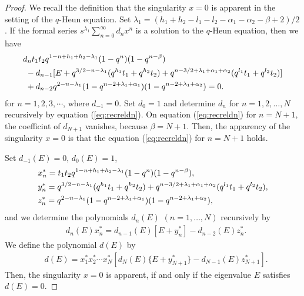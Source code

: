 \documentclass[10pt,a4paper]{amsart}
\begin{document}
\begin{proof}
We recall the definition that the singularity $x=0$ is apparent in the setting of the $q$-Heun equation.
Set $\lambda_{1} = (h_{1} + h_{2} - l_{1} - l_{2} - \alpha_{1} - \alpha_{2} - \beta + 2)/2$.
If the formal series $ s^{\lambda _{1}} \sum_{n =0}^{\infty } d_{n} x^{n} $ is a solution to the $q$-Heun equation, then we have
\begin{align}
 & d_{n} t_{1}t_{2}q^{  1- n + h_{1} + h_{2} - \lambda _{1}} (1 - q^{n})(1 - q^{n - \beta }) \label{eq:recreldn} \\
 & \ - d_{n - 1} [E + q^{3/2- n - \lambda _{1} } (q^{h_{1}}t_{1} + q^{h_{2}}t_{2} ) + q^{n - 3/2 + \lambda _{1} + \alpha _{1} + \alpha _{2} }( q^{l_{1}}t_{1} + q^{l_{2}}t_{2} ) ] \notag \\
 & \ + d_{n - 2} q^{ 2- n - \lambda _{1} } (1 - q^{n - 2 + \lambda _{1} + \alpha _{1} })(1 - q^{n - 2 + \lambda _{1} + \alpha _{2} }) = 0 . \notag
  \end{align}
for $n = 1 ,2,3, \cdots $, where $d_{-1} =0$.
Set $d_0=1$ and determine $d_n$ for $n=1,2,\dots ,N$ recursively by equation (\ref{eq:recreldn}).
On equation (\ref{eq:recreldn}) for $n=N+1$, the coefficint of $d_{N+1}$ vanishes, because $\beta = N +1 $.
Then, the apparency of the singularity $x=0$ is that the equation (\ref{eq:recreldn}) for $n=N+1$ holds.

Set $d_{-1}(E)=0 $,  $d_0(E)=1 $,
\begin{align*}
 & x^* _n = t_{1}t_{2}q^{  1- n + h_{1} + h_{2} - \lambda _{1}} (1 - q^{n})(1 - q^{n - \beta }) , \\
 & y^* _n = q^{3/2- n - \lambda _{1} } (q^{h_{1}}t_{1} + q^{h_{2}}t_{2} ) + q^{n - 3/2 + \lambda _{1} + \alpha _{1} + \alpha _{2} }( q^{l_{1}}t_{1} + q^{l_{2}}t_{2} ) , \notag \\
 & z^* _n = q^{ 2- n - \lambda _{1} } (1 - q^{n - 2 + \lambda _{1} + \alpha _{1} })(1 - q^{n - 2 + \lambda _{1} + \alpha _{2} }) , \notag
\end{align*}
and we determine the polynomials $d_n(E)$ $(n=1,\dots ,N)$ recursively by
\begin{align}
 & d_{n} (E) x^* _n = d_{n - 1} (E) [E + y^* _n ] -d_{n-2} (E) z^* _n . \label{eq:dnE}
\end{align}
We define the polynomial $d (E)$ by
\begin{align}
 & d (E) = x^* _1 x^* _2 \cdots x^* _{N} [ d_{N} (E) \{ E + y^* _{N+1} \} - d_{N-1} (E) z^* _{N+1} ] . \label{eq:dE}
\end{align}
Then, the singularity $x=0$ is apparent, if and only if the eigenvalue $E$ satisfies $d(E)=0$.


\end{proof}
\end{document}
